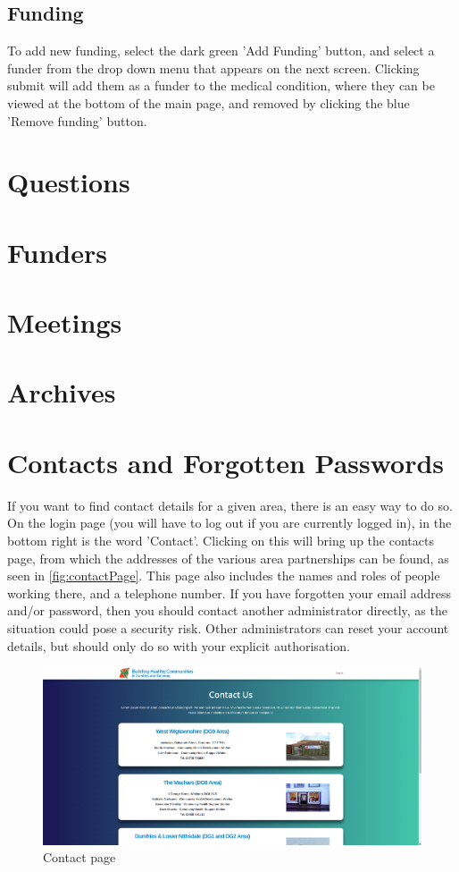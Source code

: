 \documentclass{bhcguides}
\begin{document}
\subsection{Funding}
\label{ssec:medenrolfund}

To add new funding, select the dark green 'Add Funding' button, and select a funder from the drop down menu that appears on the next screen. Clicking submit will add them as a funder to the medical condition, where they can be viewed at the bottom of the main page, and removed by clicking the blue 'Remove funding' button.

\section{Questions}
\label{sec:questions}

\section{Funders}
\label{sec:funders}

\section{Meetings}
\label{sec:meetings}

\section{Archives}
\label{sec:archives}

\section{Contacts and Forgotten Passwords}
\label{sec:contacts}

If you want to find contact details for a given area, there is an easy way to do so. On the login page (you will have to log out if you are currently logged in), in the bottom right is the word 'Contact'. Clicking on this will bring up the contacts page, from which the addresses of the various area partnerships can be found, as seen in \autoref{fig:contactPage}. This page also includes the names and roles of people working there, and a telephone number. If you have forgotten your email address and/or password, then you should contact another administrator directly, as the situation could pose a security risk. Other administrators can reset your account details, but should only do so with your explicit authorisation.

\begin{figure}[h]
 \centerline{\includegraphics[width=\textwidth, height=\textheight, keepaspectratio]{contactpage.png}}
 \caption{Contact page}
 \label{fig:contactPage}
\end{figure}
\end{document}
